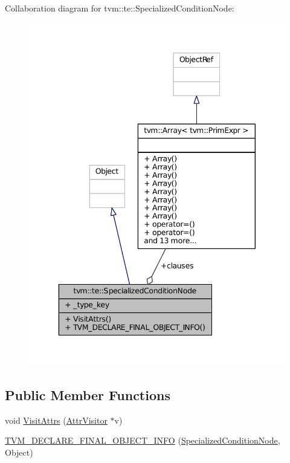 Collaboration diagram for tvm\+:\+:te\+:\+:Specialized\+Condition\+Node\+:
\nopagebreak
\begin{figure}[H]
\begin{center}
\leavevmode
\includegraphics[width=343pt]{classtvm_1_1te_1_1SpecializedConditionNode__coll__graph}
\end{center}
\end{figure}
\subsection*{Public Member Functions}
\begin{DoxyCompactItemize}
\item 
void \hyperlink{classtvm_1_1te_1_1SpecializedConditionNode_a75987b8fdad0073de0234446e9c30b24}{Visit\+Attrs} (\hyperlink{classtvm_1_1AttrVisitor}{Attr\+Visitor} $\ast$v)
\item 
\hyperlink{classtvm_1_1te_1_1SpecializedConditionNode_ae1d3f3c1cd0996e18af453ff20b02048}{T\+V\+M\+\_\+\+D\+E\+C\+L\+A\+R\+E\+\_\+\+F\+I\+N\+A\+L\+\_\+\+O\+B\+J\+E\+C\+T\+\_\+\+I\+N\+FO} (\hyperlink{classtvm_1_1te_1_1SpecializedConditionNode}{Specialized\+Condition\+Node}, Object)
\end{DoxyCompactItemize}
